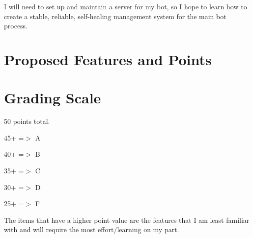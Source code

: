 \documentclass[11pt]{article}
\begin{document}
        I will need to set up and maintain a server for my bot, so I hope to learn how to create a stable, reliable, self-healing management system for the main bot process.




    \section{Proposed Features and Points}

        \begin{itemize}



        \end{itemize}




    \section{Grading Scale}

        50 points total.

        45+ =$>$ A

        40+ =$>$ B

        35+ =$>$ C

        30+ =$>$ D

        25+ =$>$ F

        The items that have a higher point value are the features that I am least familiar with and will require the most effort/learning on my part.
\end{document}
